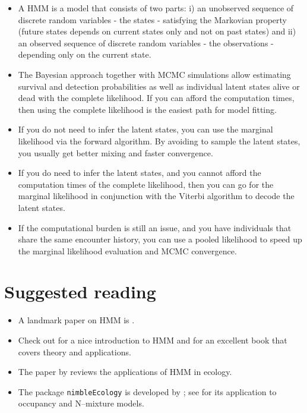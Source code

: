 \documentclass[
  12pt,
]{krantz}
\begin{document}
\begin{itemize}
\item
  A HMM is a model that consists of two parts: i) an unobserved sequence of discrete random variables - the states - satisfying the Markovian property (future states depends on current states only and not on past states) and ii) an observed sequence of discrete random variables - the observations - depending only on the current state.
\item
  The Bayesian approach together with MCMC simulations allow estimating survival and detection probabilities as well as individual latent states alive or dead with the complete likelihood. If you can afford the computation times, then using the complete likelihood is the easiest path for model fitting.
\item
  If you do not need to infer the latent states, you can use the marginal likelihood via the forward algorithm. By avoiding to sample the latent states, you usually get better mixing and faster convergence.
\item
  If you do need to infer the latent states, and you cannot afford the computation times of the complete likelihood, then you can go for the marginal likelihood in conjunction with the Viterbi algorithm to decode the latent states.
\item
  If the computational burden is still an issue, and you have individuals that share the same encounter history, you can use a pooled likelihood to speed up the marginal likelihood evaluation and MCMC convergence.
\end{itemize}

\section{Suggested reading}\label{suggested-reading-2}

\begin{itemize}
\item
  A landmark paper on HMM is \citet{Rabiner1989}.
\item
  Check out \citet{JurafskySpeechAL} for a nice introduction to HMM and \citet{ZucchiniEtAl2016} for an excellent book that covers theory and applications.
\item
  The paper by \citet{mcclintock_uncovering_2020} reviews the applications of HMM in ecology.
\item
  The package \texttt{nimbleEcology} is developed by \citet{goldstein2019nimbleecology}; see \citet{ponisio2020customizing} for its application to occupancy and N--mixture models.
\end{itemize}
\end{document}
